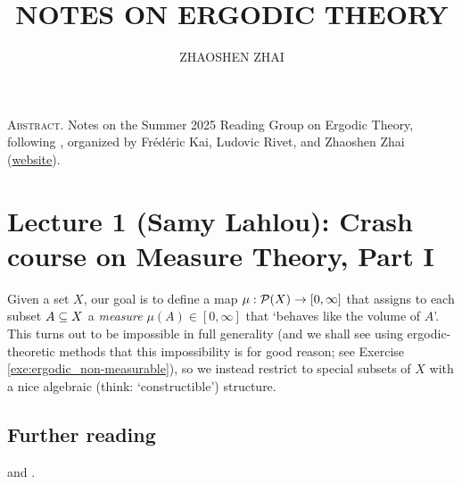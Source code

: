 \documentclass[reqno, twoside]{article}
\begin{document}
    \title{\textbf{\normalsize\MakeUppercase{Notes on Ergodic Theory}}}
    \author{\footnotesize\MakeUppercase{Zhaoshen Zhai}}
    \date{}
    \maketitle

    \begin{center}
        \vspace{-0.3in}
        \begin{minipage}{0.85\textwidth}
            {\footnotesize{\textsc{Abstract.}} Notes on the Summer 2025 Reading Group on Ergodic Theory, following \cite{Tse22}, organized by Frédéric Kai, Ludovic Rivet, and Zhaoshen Zhai (\href{https://ergodicmcgill.github.io/}{website}).}
        \end{minipage}
    \end{center}

    \tableofcontents\vspace{0.2in}

    \section{Lecture 1 (Samy Lahlou): Crash course on Measure Theory, Part I}\label{sec:1}

    Given a set $X$, our goal is to define a map $\mu:\mathcal{P}(X)\to[0,\infty]$ that assigns to each subset $A\subseteq X$ a \textit{measure} $\mu(A)\in[0,\infty]$ that `behaves like the volume of $A$'. This turns out to be impossible in full generality (and we shall see using ergodic-theoretic methods that this impossibility is for good reason; see Exercise \ref{exe:ergodic_non-measurable}), so we instead restrict to special subsets of $X$ with a nice algebraic (think: `constructible') structure.

    {\vspace{-0.1in}\small\subsection*{Further reading}\cite[Lectures 1 to 5]{Tse23} and \cite[Chapter 1]{Fol99}.}
\end{document}
